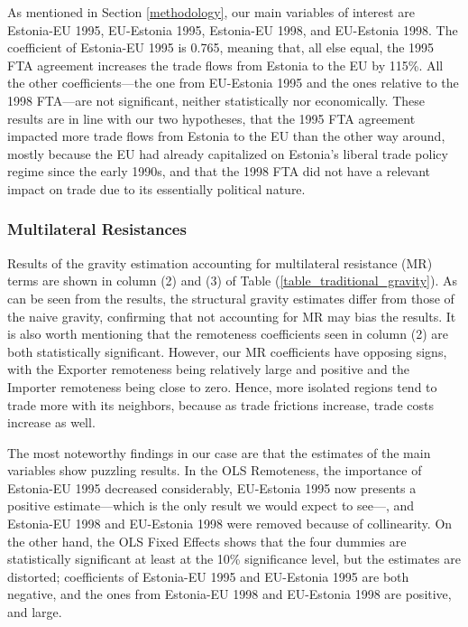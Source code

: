 \documentclass[a4paper,10pt]{article}
\begin{document}
As mentioned in Section \ref{methodology}, our main variables of interest are Estonia-EU 1995, EU-Estonia 1995, Estonia-EU 1998, and EU-Estonia 1998. The coefficient of Estonia-EU 1995 is 0.765, meaning that, all else equal, the 1995 FTA agreement increases the trade flows from Estonia to the EU by 115\%. All the other coefficients---the one from EU-Estonia 1995 and the ones relative to the 1998 FTA---are not significant, neither statistically nor economically. These results are in line with our two hypotheses, that the 1995 FTA agreement impacted more trade flows from Estonia to the EU than the other way around, mostly because the EU had already capitalized on Estonia's liberal trade policy regime since the early 1990s, and that the 1998 FTA did not have a relevant impact on trade due to its essentially political nature.

\subsubsection{Multilateral Resistances} \label{results_traditional_mr}

Results of the gravity estimation accounting for multilateral resistance (MR) terms are shown in column (2) and (3) of Table (\ref{table_traditional_gravity}). As can be seen from the results, the structural gravity estimates differ from those of the naive gravity, confirming that not accounting for MR may bias the results. It is also worth mentioning that the remoteness coefficients seen in column (2) are both statistically significant. However, our MR coefficients have opposing signs, with the Exporter remoteness being relatively large and positive and the Importer remoteness being close to zero. Hence, more isolated regions tend to trade more with its neighbors, because as trade frictions increase, trade costs increase as well. 

The most noteworthy findings in our case are that the estimates of the main variables show puzzling results. In the OLS Remoteness, the importance of Estonia-EU 1995 decreased considerably, EU-Estonia 1995 now presents a positive estimate---which is the only result we would expect to see---, and Estonia-EU 1998 and EU-Estonia 1998 were removed because of collinearity. On the other hand, the OLS Fixed Effects shows that the four dummies are statistically significant at least at the 10\% significance level, but the estimates are distorted; coefficients of Estonia-EU 1995 and EU-Estonia 1995 are both negative, and the ones from Estonia-EU 1998 and EU-Estonia 1998 are positive, and large.
\end{document}
